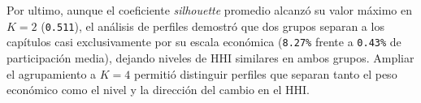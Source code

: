 \documentclass[
]{article}
\begin{document}
Por ultimo, aunque el coeficiente \emph{silhouette} promedio alcanzó su
valor máximo en \(K=2\) (\texttt{0.511}), el análisis de perfiles
demostró que dos grupos separan a los capítulos casi exclusivamente por
su escala económica (\texttt{8.27\%} frente a \texttt{0.43\%} de
participación media), dejando niveles de HHI similares en ambos grupos.
Ampliar el agrupamiento a \(K=4\) permitió distinguir perfiles que
separan tanto el peso económico como el nivel y la dirección del cambio
en el HHI.
\end{document}
